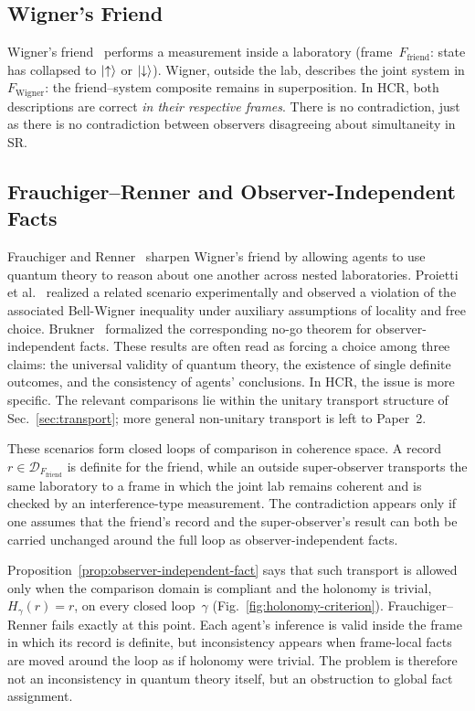\documentclass[aps,prd,twocolumn,superscriptaddress,nofootinbib,floatfix]{revtex4-2}
\newcommand{\HCR}{HCR}
\newcommand{\CR}{\HCR}  %
\begin{document}
\subsection{Wigner's Friend}

Wigner's friend~\cite{wignerRemarksMindbodyQuestion1961} performs a measurement inside a laboratory (frame~$F_{\mathrm{friend}}$: state has collapsed to $\ket{\uparrow}$ or $\ket{\downarrow}$). Wigner, outside the lab, describes the joint system in $F_{\mathrm{Wigner}}$: the friend--system composite remains in superposition. In \CR{}, both descriptions are correct \emph{in their respective frames}. There is no contradiction, just as there is no contradiction between observers disagreeing about simultaneity in SR.

\subsection{Frauchiger--Renner and Observer-Independent Facts}\label{sec:fr-proietti}

Frauchiger and Renner~\cite{frauchigerQuantumTheoryCannot2018} sharpen Wigner's friend by allowing agents to use quantum theory to reason about one another across nested laboratories. Proietti et al.~\cite{proiettiExperimentalTestLocal2019} realized a related scenario experimentally and observed a violation of the associated Bell-Wigner inequality under auxiliary assumptions of locality and free choice. Brukner~\cite{bruknerNoGoTheorem2018} formalized the corresponding no-go theorem for observer-independent facts. These results are often read as forcing a choice among three claims: the universal validity of quantum theory, the existence of single definite outcomes, and the consistency of agents' conclusions. In \CR{}, the issue is more specific. The relevant comparisons lie within the unitary transport structure of Sec.~\ref{sec:transport}; more general non-unitary transport is left to Paper~2.

These scenarios form closed loops of comparison in coherence space. A record $r \in \mathcal{D}_{F_{\mathrm{friend}}}$ is definite for the friend, while an outside super-observer transports the same laboratory to a frame in which the joint lab remains coherent and is checked by an interference-type measurement. The contradiction appears only if one assumes that the friend's record and the super-observer's result can both be carried unchanged around the full loop as observer-independent facts.

Proposition~\ref{prop:observer-independent-fact} says that such transport is allowed only when the comparison domain is compliant and the holonomy is trivial, $H_\gamma(r) = r$, on every closed loop~$\gamma$ (Fig.~\ref{fig:holonomy-criterion}). Frauchiger--Renner fails exactly at this point. Each agent's inference is valid inside the frame in which its record is definite, but inconsistency appears when frame-local facts are moved around the loop as if holonomy were trivial. The problem is therefore not an inconsistency in quantum theory itself, but an obstruction to global fact assignment.
\end{document}
